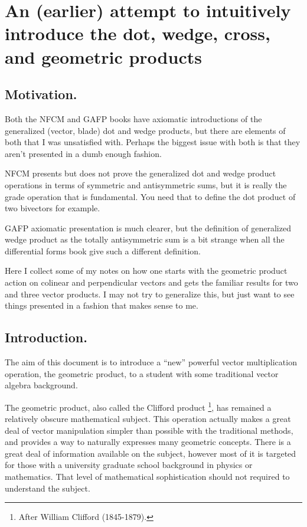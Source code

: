 \chapter{An (earlier) attempt to intuitively introduce the dot, wedge, cross, and geometric products}

\date{ March 17, 2008.  $RCSfile: gaGradeDotWedge.tex,v $ Last $Revision: 1.9 $ $Date: 2009/06/11 19:45:50 $ }

\section{Motivation. }

Both the NFCM and GAFP books have axiomatic introductions of the 
generalized (vector, blade) dot and wedge products, but there are
elements of both that I was unsatisfied with.  Perhaps the biggest
issue with both is that they aren't presented in a dumb enough fashion.

NFCM presents but
does not prove the generalized dot and wedge product operations
in terms of symmetric and antisymmetric sums, but it is really the
grade operation that is fundamental.  You need that to define the
dot product of two bivectors for example.

GAFP axiomatic presentation is much clearer, but the definition of
generalized wedge product as the totally antisymmetric sum is a bit
strange when all the differential forms book give such a different
definition.

Here I collect some of my notes on how one starts with the geometric
product action on colinear and perpendicular vectors and gets the 
familiar results for two and three vector products.  I may not try to
generalize this, but just want to see things presented in a fashion
that makes sense to me.

\section{Introduction.}

The aim of this document is to introduce a ``new'' powerful vector multiplication operation, the geometric product,
to a student with some traditional vector algebra background.

The geometric product, also called the Clifford product 
\footnote{After William Clifford (1845-1879).}, has remained a relatively obscure mathematical subject. 
This operation actually makes a great deal of vector manipulation simpler than possible with the traditional methods, and
provides a way to naturally expresses many geometric concepts.
There is a great deal of information available on the subject, however most of it is targeted for those with a 
university graduate school background in physics or mathematics.  That level of mathematical sophistication
should not required to understand the subject.

